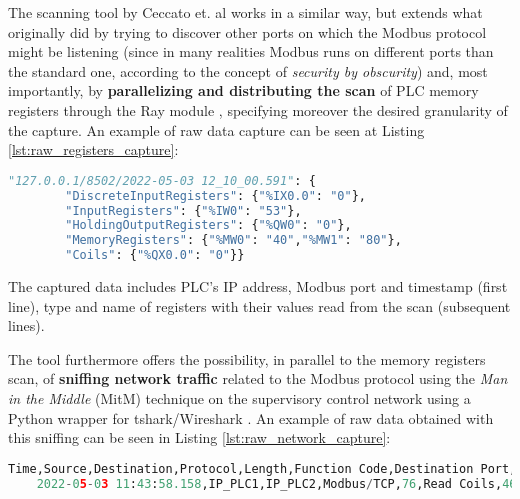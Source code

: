 \bigskip
The scanning tool by Ceccato et. al works in a similar way, but extends what originally did by trying to discover other ports on which the Modbus protocol might be listening (since in many realities Modbus runs on different ports than the standard one, according to the concept of \textit{security by obscurity}) and, most importantly, by \textbf{parallelizing and distributing the scan} of PLC memory registers through the Ray module \cite{ray}, specifying moreover the desired granularity of the capture. An example of raw data capture can be seen at Listing \ref{lst:raw_registers_capture}:

\begin{lstlisting}[language=Python, numbers=none, caption=Example of registers capture, label=lst:raw_registers_capture]	
	"127.0.0.1/8502/2022-05-03 12_10_00.591": {
		"DiscreteInputRegisters": {"%IX0.0": "0"},
		"InputRegisters": {"%IW0": "53"},
		"HoldingOutputRegisters": {"%QW0": "0"},
		"MemoryRegisters": {"%MW0": "40","%MW1": "80"},
		"Coils": {"%QX0.0": "0"}}
\end{lstlisting}
The captured data includes PLC's IP address, Modbus port and timestamp (first line), type and name of registers with their values read from the scan (subsequent lines).

\bigskip
The tool furthermore offers the possibility, in parallel to the memory registers scan, of \textbf{sniffing network traffic} related to the Modbus protocol using the \textit{Man in the Middle} (MitM) technique on the supervisory control network using a Python wrapper for tshark/Wireshark \cite{tshark} \cite{wireshark}. An example of raw data obtained with this sniffing can be seen in Listing \ref{lst:raw_network_capture}:

\begin{lstlisting}[language=Python, numbers=none, caption=Example of raw network capture, label=lst:raw_network_capture]	
	Time,Source,Destination,Protocol,Length,Function Code,Destination Port,Source Port,Data,Frame length on the wire,Bit Value,Request Frame,Reference Number,Info
	2022-05-03 11:43:58.158,IP_PLC1,IP_PLC2,Modbus/TCP,76,Read Coils,46106,502,,76,TRUE,25,,"Response: Trans: 62; Unit: 1, Func: 1: Read Coils"
\end{lstlisting}

